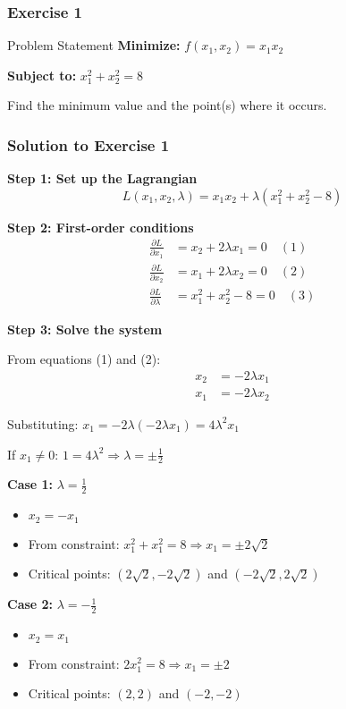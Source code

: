 \documentclass[aspectratio=1610]{beamer}
\begin{document}
\begin{frame}
\frametitle{Exercise 1}
\begin{block}{Problem Statement}
\textbf{Minimize:} $f(x_1, x_2) = x_1 x_2$

\textbf{Subject to:} $x_1^2 + x_2^2 = 8$
\end{block}

\vspace{1cm}
Find the minimum value and the point(s) where it occurs.
\end{frame}

\begin{frame}[allowframebreaks]
\frametitle{Solution to Exercise 1}

\textbf{Step 1: Set up the Lagrangian}
$$L(x_1, x_2, \lambda) = x_1 x_2 + \lambda(x_1^2 + x_2^2 - 8)$$

\textbf{Step 2: First-order conditions}
\begin{align}
\frac{\partial L}{\partial x_1} &= x_2 + 2\lambda x_1 = 0 \quad (1)\\
\frac{\partial L}{\partial x_2} &= x_1 + 2\lambda x_2 = 0 \quad (2)\\
\frac{\partial L}{\partial \lambda} &= x_1^2 + x_2^2 - 8 = 0 \quad (3)
\end{align}

\framebreak

\textbf{Step 3: Solve the system}

From equations (1) and (2):
\begin{align}
x_2 &= -2\lambda x_1\\
x_1 &= -2\lambda x_2
\end{align}

Substituting: $x_1 = -2\lambda(-2\lambda x_1) = 4\lambda^2 x_1$

If $x_1 \neq 0$: $1 = 4\lambda^2 \Rightarrow \lambda = \pm\frac{1}{2}$

\framebreak

\textbf{Case 1:} $\lambda = \frac{1}{2}$
\begin{itemize}
\item $x_2 = -x_1$
\item From constraint: $x_1^2 + x_1^2 = 8 \Rightarrow x_1 = \pm 2\sqrt{2}$
\item Critical points: $(2\sqrt{2}, -2\sqrt{2})$ and $(-2\sqrt{2}, 2\sqrt{2})$
\end{itemize}

\textbf{Case 2:} $\lambda = -\frac{1}{2}$
\begin{itemize}
\item $x_2 = x_1$
\item From constraint: $2x_1^2 = 8 \Rightarrow x_1 = \pm 2$
\item Critical points: $(2, 2)$ and $(-2, -2)$
\end{itemize}


\end{frame}
\end{document}
